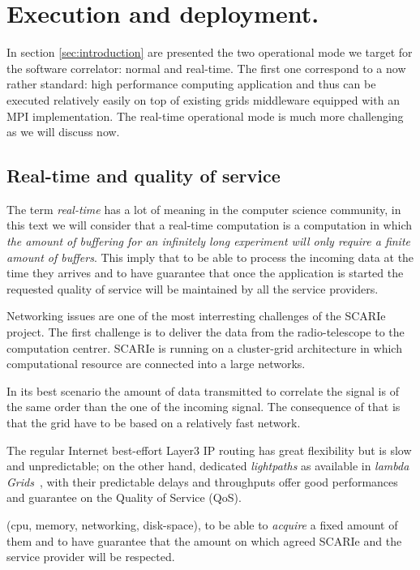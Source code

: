 \section{Execution and deployment.}
In section \ref{sec:introduction} are presented the two operational 
mode we target for the software correlator: normal and real-time. 
The first one correspond to a now rather standard: high performance computing 
application and thus can be executed relatively easily 
on top of existing grids middleware equipped with an 
MPI implementation. The real-time operational mode 
is much more challenging as we will discuss now. 

\subsection{Real-time and quality of service}
The term \emph{real-time} has a lot of meaning in the computer science community, 
in this text we will consider that a real-time computation is a computation in which 
\emph{the amount of buffering for an infinitely long experiment will only require 
a finite amount of buffers}. This imply that to be able to process the incoming 
data at the time they arrives and to have guarantee that once the application
is started the requested quality of service will be maintained by all
the service providers. 

Networking issues are one of the most interresting challenges 
of the SCARIe project. The first challenge is to deliver the 
data from the radio-telescope to the computation centrer. SCARIe
is running on a cluster-grid architecture in which computational 
resource are connected into a large networks. 

In its best scenario 
the amount of data transmitted to correlate the signal is of the same 
order than the one of the incoming signal. The consequence of that is that 
the grid have to be based on a relatively fast network.  

The regular Internet best-effort Layer3 IP routing has great
flexibility but is slow and unpredictable; on the other hand,
dedicated \textit{lightpaths} as available in \textit{lambda
  Grids}~\cite{eslea-2007}, with their predictable delays and
throughputs offer good performances and guarantee on the Quality of
Service (QoS). 


 (cpu, memory, networking, disk-space), to be 
able to \emph{acquire} a fixed amount of them and to have guarantee 
that the amount on which agreed SCARIe and the service provider 
will be respected. 
 
